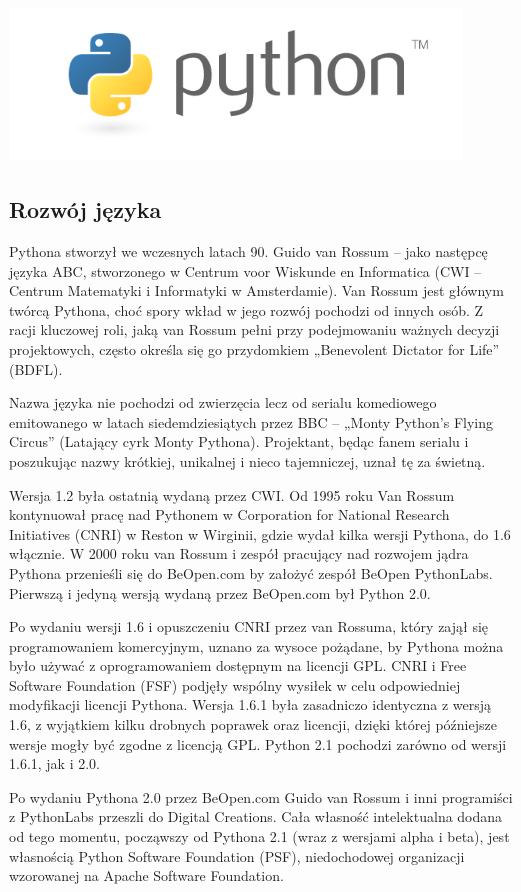 \documentclass{article}
\begin{document}
\includegraphics[width=0.9\textwidth]{python.png}
\subsection{Rozwój języka}
	Pythona stworzył we wczesnych latach 90. Guido van Rossum – jako następcę języka ABC, stworzonego w Centrum voor Wiskunde en Informatica (CWI – Centrum Matematyki i Informatyki w Amsterdamie). Van Rossum jest głównym twórcą Pythona, choć spory wkład w jego rozwój pochodzi od innych osób. Z racji kluczowej roli, jaką van Rossum pełni przy podejmowaniu ważnych decyzji projektowych, często określa się go przydomkiem „Benevolent Dictator for Life” (BDFL).

Nazwa języka nie pochodzi od zwierzęcia lecz od serialu komediowego emitowanego w latach siedemdziesiątych przez BBC – „Monty Python’s Flying Circus” (Latający cyrk Monty Pythona). Projektant, będąc fanem serialu i poszukując nazwy krótkiej, unikalnej i nieco tajemniczej, uznał tę za świetną.

Wersja 1.2 była ostatnią wydaną przez CWI. Od 1995 roku Van Rossum kontynuował pracę nad Pythonem w Corporation for National Research Initiatives (CNRI) w Reston w Wirginii, gdzie wydał kilka wersji Pythona, do 1.6 włącznie. W 2000 roku van Rossum i zespół pracujący nad rozwojem jądra Pythona przenieśli się do BeOpen.com by założyć zespół BeOpen PythonLabs. Pierwszą i jedyną wersją wydaną przez BeOpen.com był Python 2.0.

Po wydaniu wersji 1.6 i opuszczeniu CNRI przez van Rossuma, który zajął się programowaniem komercyjnym, uznano za wysoce pożądane, by Pythona można było używać z oprogramowaniem dostępnym na licencji GPL. CNRI i Free Software Foundation (FSF) podjęły wspólny wysiłek w celu odpowiedniej modyfikacji licencji Pythona. Wersja 1.6.1 była zasadniczo identyczna z wersją 1.6, z wyjątkiem kilku drobnych poprawek oraz licencji, dzięki której późniejsze wersje mogły być zgodne z licencją GPL. Python 2.1 pochodzi zarówno od wersji 1.6.1, jak i 2.0.

Po wydaniu Pythona 2.0 przez BeOpen.com Guido van Rossum i inni programiści z PythonLabs przeszli do Digital Creations. Cała własność intelektualna dodana od tego momentu, począwszy od Pythona 2.1 (wraz z wersjami alpha i beta), jest własnością Python Software Foundation (PSF), niedochodowej organizacji wzorowanej na Apache Software Foundation.
\end{document}
